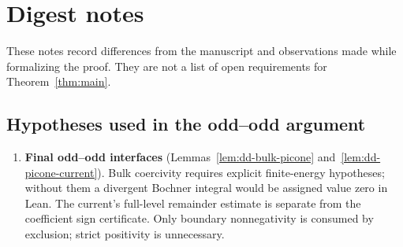 \chapter{Digest notes}
\label{chap:notes}

These notes record differences from the manuscript and observations made
while formalizing the proof. They are not a list of open requirements for
Theorem~\ref{thm:main}.

\section*{Hypotheses used in the odd--odd argument}
\begin{enumerate}
  \item \textbf{Final odd--odd interfaces}
        (Lemmas~\ref{lem:dd-bulk-picone} and~\ref{lem:dd-picone-current}).
        Bulk coercivity requires explicit finite-energy hypotheses; without
        them a divergent Bochner integral would be assigned value zero in
        Lean. The current's full-level remainder estimate is separate from
        the coefficient sign certificate.
        Only boundary nonnegativity is consumed by exclusion; strict
        positivity is unnecessary.
\end{enumerate}


